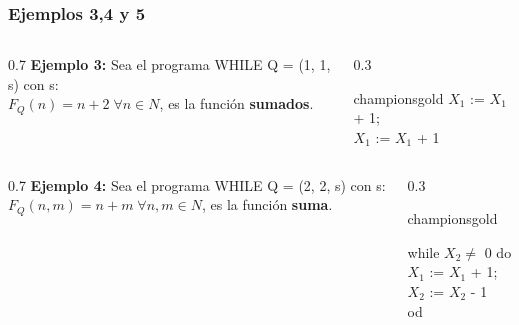 \documentclass[xcolor=table]{beamer}
\begin{document}
\begin{frame}[fragile]\frametitle{Ejemplos 3,4 y 5} \scriptsize  

\begin{columns}

    \begin{column}{0.7\textwidth}
       \textbf{Ejemplo 3:}
       \vspace{0.2cm}
         Sea el programa WHILE Q = (1, 1, s) con s:\\
\vspace{0.2cm}
         $F_Q(n) = n+2 \; \forall n \in N$, es la función \textbf{sumados}.

    \end{column}

    \begin{column}{0.3\textwidth}
        \begin{colorblock}[black]{championsgold}{}\scriptsize
        \hspace{0.5cm}    $X_1$ := $X_1$ + 1;\\
        \hspace{0.5cm}    $X_1$ := $X_1$ + 1\\
        \end{colorblock}
    \end{column}
    
\end{columns}


\begin{columns}

    \begin{column}{0.7\textwidth}
       \textbf{Ejemplo 4:}
       \vspace{0.2cm}
         Sea el programa WHILE Q = (2, 2, s) con s:\\
\vspace{0.2cm}
         $F_Q(n,m) = n+m \; \forall n,m \in N$, es la función \textbf{suma}.

    \end{column}

    \begin{column}{0.3\textwidth}
        \begin{colorblock}[black]{championsgold}{}\scriptsize

        \hspace{0.5cm}while $X_2 \neq$ 0 do\\
        \hspace{0.75cm}    $X_1$ := $X_1$ + 1;\\
        \hspace{0.75cm}    $X_2$ := $X_2$ - 1\\
        \hspace{0.5cm}od
        \end{colorblock}
    \end{column}
    

\end{columns}
\end{frame}
\end{document}
